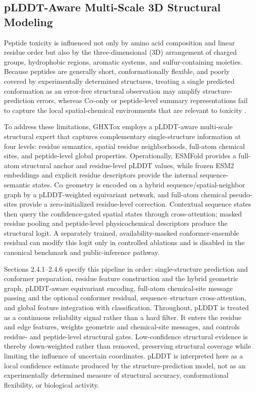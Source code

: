 \documentclass[12pt]{article}
\begin{document}
\subsection{pLDDT-Aware Multi-Scale 3D Structural Modeling}
Peptide toxicity is influenced not only by amino acid composition and linear
residue order but also by the three-dimensional (3D) arrangement of charged
groups, hydrophobic regions, aromatic systems, and sulfur-containing
moieties. Because peptides are generally short, conformationally flexible,
and poorly covered by experimentally determined structures, treating a single
predicted conformation as an error-free structural observation may amplify
structure-prediction errors, whereas C$\alpha$-only or peptide-level summary
representations fail to capture the local spatial-chemical environments that
are relevant to toxicity \cite{wang2025peptitox,jiao2025structoxnet,gulsevin2022benchmarking}.

To address these limitations, GHXTox employs a pLDDT-aware multi-scale
structural expert that captures complementary single-structure information at
four levels: residue semantics, spatial residue neighborhoods, full-atom
chemical sites, and peptide-level global properties. Operationally, ESMFold
provides a full-atom structural anchor and residue-level pLDDT values, while
frozen ESM2 embeddings and explicit residue descriptors provide the internal
sequence-semantic states. C$\alpha$ geometry is encoded on a hybrid
sequence/spatial-neighbor graph by a pLDDT-weighted equivariant network, and
full-atom chemical pseudo-sites provide a zero-initialized residue-level
correction. Contextual sequence states then query the confidence-gated spatial
states through cross-attention; masked residue pooling and peptide-level
physicochemical descriptors produce the structural logit. A separately
trained, availability-masked conformer-ensemble residual can modify this logit
only in controlled ablations and is disabled in the canonical benchmark and
public-inference pathway.

Sections 2.4.1--2.4.6 specify this pipeline in order: single-structure
prediction and conformer preparation, residue feature construction and the
hybrid geometric graph, pLDDT-aware equivariant encoding, full-atom
chemical-site message passing and the optional conformer residual,
sequence--structure cross-attention, and global feature integration with
classification. Throughout, pLDDT is treated as a continuous reliability
signal rather than a hard filter. It enters the residue and edge features,
weights geometric and chemical-site messages, and controls residue- and
peptide-level structural gates. Low-confidence structural evidence is thereby
down-weighted rather than removed, preserving structural coverage while
limiting the influence of uncertain coordinates. pLDDT is interpreted here as
a local confidence estimate produced by the structure-prediction model, not as
an experimentally determined measure of structural accuracy, conformational
flexibility, or biological activity.
\end{document}
